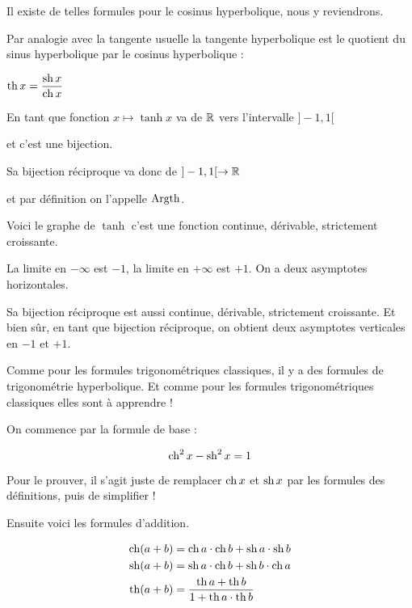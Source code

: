   
Il existe de telles formules pour le cosinus hyperbolique, 
nous y reviendrons.
  

\diapo


Par analogie avec la tangente usuelle la tangente hyperbolique 
est le quotient du sinus hyperbolique par le cosinus hyperbolique :

$\displaystyle \mathop{\mathrm{th}}\nolimits x = \frac{\mathop{\mathrm{sh}}\nolimits x}{\mathop{\mathrm{ch}}\nolimits x}$

\change

En tant que fonction $x \mapsto \tanh x$  va de $\mathbb{R}$ vers l'intervalle $]-1,1[$

et c'est une bijection.


Sa bijection réciproque va donc de $]-1,1[\to\mathbb{R}$


et par définition on l'appelle $\mathop{\mathrm{Argth}}\nolimits$.

\change

Voici le graphe de $\tanh$ c'est une fonction continue, dérivable,
strictement croissante.

La limite en $-\infty$ est $-1$, la limite en $+\infty$ est $+1$.
On a deux asymptotes horizontales.

Sa bijection réciproque est aussi continue, dérivable,
strictement croissante. Et bien sûr, en tant que bijection réciproque,
on obtient deux asymptotes verticales en $-1$ et $+1$.

\change


\diapo

Comme pour les formules trigonométriques classiques, il y a des formules 
de trigonométrie hyperbolique. Et comme pour les formules trigonométriques classiques
elles sont à apprendre !

On commence par la formule de base :

$$\mathop{\mathrm{ch}}\nolimits^2 x - \mathop{\mathrm{sh}}\nolimits^2 x = 1$$

Pour le prouver, il s'agit juste de remplacer $\mathop{\mathrm{ch}}\nolimits x$ et $\mathop{\mathrm{sh}}\nolimits x$
par les formules des définitions, puis de simplifier !

\change

Ensuite voici les formules d'addition.

\begin{align*}
\mathop{\mathrm{ch}}\nolimits(a+b)&=\mathop{\mathrm{ch}}\nolimits a\cdot\mathop{\mathrm{ch}}\nolimits b + \mathop{\mathrm{sh}}\nolimits a\cdot\mathop{\mathrm{sh}}\nolimits b\\
\mathop{\mathrm{sh}}\nolimits(a+b)&=\mathop{\mathrm{sh}}\nolimits a\cdot\mathop{\mathrm{ch}}\nolimits b  +  \mathop{\mathrm{sh}}\nolimits b\cdot\mathop{\mathrm{ch}}\nolimits a\\
\mathop{\mathrm{th}}\nolimits (a+b)&=\frac{\mathop{\mathrm{th}}\nolimits a + \mathop{\mathrm{th}}\nolimits b}{1+\mathop{\mathrm{th}}\nolimits a\cdot\mathop{\mathrm{th}}\nolimits b}\\
\end{align*}

